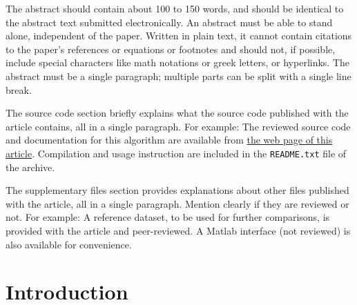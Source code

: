 \documentclass{ipol}
\begin{document}
\begin{ipolAbstract}
The abstract should contain about 100 to 150 words, and should be
identical to the abstract text submitted electronically. An abstract
must be able to stand alone, independent of the paper.  Written in
plain text, it cannot contain citations to the paper’s references or
equations or footnotes and should not, if possible, include special
characters like math notations or greek letters, or hyperlinks. The
abstract must be a single paragraph; multiple parts can be split with
a single line break.
\end{ipolAbstract}

\begin{ipolCode}
The source code section briefly explains what the source code
published with the article contains, all in a single paragraph. For
example: The reviewed source code and documentation for this algorithm
are available from \href{\ipolLink}{the web page of this
  article}. Compilation and usage instruction are included in the
\verb|README.txt| file of the archive.
\end{ipolCode}


\begin{ipolSupp}
The supplementary files section provides explanations about other
files published with the article, all in a single paragraph. Mention
clearly if they are reviewed or not. For example: A reference dataset,
to be used for further comparisons, is provided with the article and
peer-reviewed. A Matlab interface (not reviewed) is also available for
convenience.
\end{ipolSupp}



\section{Introduction}



%
%
\end{document}
